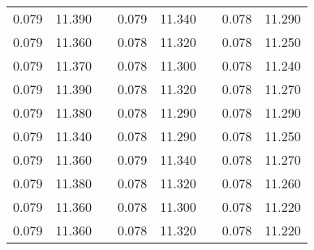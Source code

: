 \documentclass[12pt]{mwrep}
\begin{document}
\begin{table}[H]
\begin{tabularx}{\textwidth}{|Y|Y|p{2mm}|Y|Y|p{2mm}|Y|Y|}
			0.079 & 11.390 && 0.079 & 11.340 && 0.078 & 11.290 \\
			0.079 & 11.360 && 0.078 & 11.320 && 0.078 & 11.250 \\
			0.079 & 11.370 && 0.078 & 11.300 && 0.078 & 11.240 \\
			0.079 & 11.390 && 0.078 & 11.320 && 0.078 & 11.270 \\
			0.079 & 11.380 && 0.078 & 11.290 && 0.078 & 11.290 \\
			0.079 & 11.340 && 0.078 & 11.290 && 0.078 & 11.250 \\
			0.079 & 11.360 && 0.079 & 11.340 && 0.078 & 11.270 \\
			0.079 & 11.380 && 0.078 & 11.320 && 0.078 & 11.260 \\
			0.079 & 11.360 && 0.078 & 11.300 && 0.078 & 11.220 \\
			0.079 & 11.360 && 0.078 & 11.320 && 0.078 & 11.220 \\
		\end{tabularx}
	\end{table}
	
	
	
	
	
	
	
	
	
	
	
	
	
	
	
	
	
	
	
\end{document}
